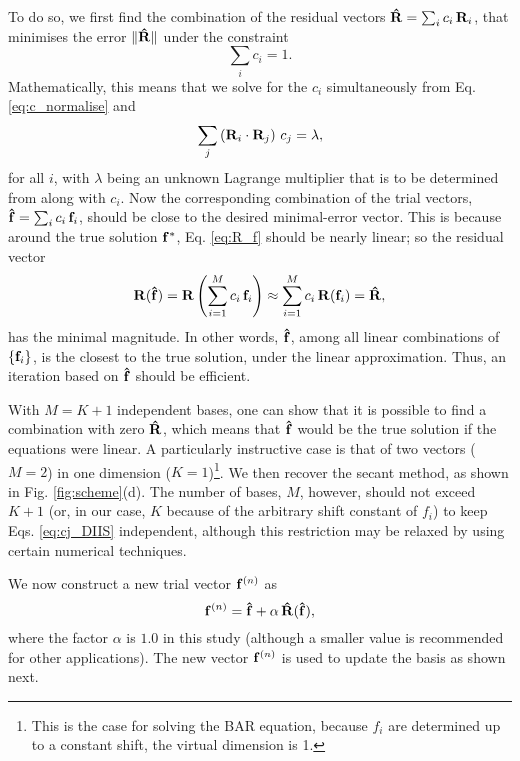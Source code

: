 \documentclass{gMOS2e}
\begin{document}
To do so, we first find the combination of the residual vectors
$\mathbf{\hat R} = \sum_i c_i \, \mathbf{R}_i$,
that minimises the error
$\| \mathbf{\hat R} \|$
under the constraint
\begin{equation}
  \sum_i c_i = 1.
  \label{eq:c_normalise}
\end{equation}
%
Mathematically,
this means that we solve for the $c_i$ simultaneously
from Eq. \eqref{eq:c_normalise} and
%
\begin{equation}
  \sum_j \left( \mathbf{R}_i \cdot \mathbf{R}_j \right) \, c_j = \lambda,
  \label{eq:cj_DIIS}
\end{equation}
%
for all $i$,
with $\lambda$ being an unknown Lagrange multiplier
that is to be determined from along with $c_i$.
%
Now the corresponding combination
of the trial vectors,
$\mathbf{\hat f} = \sum_i c_i \, \mathbf{f}_i$,
should be close to the desired minimal-error vector.
%
This is because
around the true solution $\mathbf{f}^*$,
Eq. \eqref{eq:R_f} should be nearly linear;
so the residual vector
%
\[
\mathbf{R}(\mathbf{\hat f})
=
\mathbf{R}\left(
  \sum_{i=1}^M c_i \, \mathbf{f}_i
\right)
\approx
\sum_{i=1}^M c_i \, \mathbf{R}(\mathbf{f}_i)
=\mathbf{\hat R},
\]
%
has the minimal magnitude.
%
In other words,
$\mathbf{\hat f}$,
among all linear combinations of $\{ \mathbf{f}_i \}$,
is the closest to the true solution,
under the linear approximation.
%
Thus,
an iteration based on
$\mathbf{\hat f}$
should be efficient.



With $M = K + 1$ independent bases,
one can show that
it is possible to
find a combination with zero $\mathbf{\hat R}$,
which means that
$\mathbf{\hat f}$ would be the true solution
if the equations were linear.
%
A particularly instructive case is that of
two vectors ($M = 2$)
in one dimension ($K = 1$)\footnote{
This is the case for solving the BAR equation,
because $f_i$ are determined up to a constant shift,
the virtual dimension is 1.}.
%
We then recover
the secant method\cite{press},
as shown in Fig. \ref{fig:scheme}(d).
%
The number of bases, $M$, however,
should not exceed $K + 1$
(or, in our case, $K$
because of the arbitrary shift constant of $f_i$)
to keep Eqs. \eqref{eq:cj_DIIS}
independent,
%
although this restriction may be relaxed
by using certain numerical techniques\cite{
press}.




We now construct a new trial vector $\mathbf{f}^{(n)}$ as
%
\begin{equation*}
\mathbf{f}^{(n)}
=
\mathbf{\hat f}
+
\alpha \, \mathbf{\hat R}( \mathbf{\hat f} ),
\end{equation*}
%
where the factor $\alpha$ is $1.0$ in this study
(although a smaller value is recommended
for other applications\cite{kovalenko1999, howard2011}).
%
The new vector $\mathbf{f}^{(n)}$
is used to update the basis as shown next.
\end{document}
